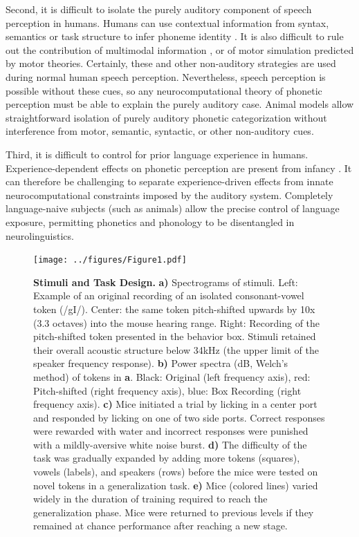\documentclass[11pt]{article}\usepackage[]{graphicx}\usepackage[]{color}
\begin{document}
Second, it is difficult to isolate the purely auditory component of speech perception in humans. Humans can use contextual information from syntax, semantics or task structure to infer phoneme identity \cite{Fox2016,Schouten2003}. It is also difficult to rule out the contribution of multimodal information \cite{Rosenblum2008}, or of motor simulation predicted by motor theories. Certainly, these and other non-auditory strategies are used during normal human speech perception. Nevertheless, speech perception is possible without these cues, so any neurocomputational theory of phonetic perception must be able to explain the purely auditory case. Animal models allow straightforward isolation of purely auditory phonetic categorization without interference from motor, semantic, syntactic, or other non-auditory cues.

Third, it is difficult to control for prior language experience in humans. Experience-dependent effects on phonetic perception are present from infancy \cite{Kuhl1992}. It can therefore be challenging to separate experience-driven effects from innate neurocomputational constraints imposed by the auditory system. Completely language-naive subjects (such as animals) allow the precise control of language exposure, permitting phonetics and phonology to be disentangled in neurolinguistics.

\begin{figure}[!hb]
\begin{centering}
\texttt{[image: ../figures/Figure1.pdf]}
\caption{\label{spectro}{\textbf{Stimuli and Task Design.} \textbf{a)} Spectrograms of stimuli. Left: Example of an original recording of an isolated consonant-vowel token (/gI/). Center: the same token pitch-shifted upwards by 10x (3.3 octaves) into the mouse hearing range. Right: Recording of the pitch-shifted token presented in the behavior box. Stimuli retained their overall acoustic structure below 34kHz (the upper limit of the speaker frequency response). \textbf{b)} Power spectra (dB, Welch's method) of tokens in \textbf{a}. Black: Original (left frequency axis), red: Pitch-shifted (right frequency axis), blue: Box Recording (right frequency axis). \textbf{c)} Mice initiated a trial by licking in a center port and responded by licking on one of two side ports. Correct responses were rewarded with water and incorrect responses were punished with a mildly-aversive white noise burst. \textbf{d)} The difficulty of the task was gradually expanded by adding more tokens (squares), vowels (labels), and speakers (rows) before the mice were tested on novel tokens in a generalization task. \textbf{e)} Mice (colored lines) varied widely in the duration of training required to reach the generalization phase. Mice were returned to previous levels if they remained at chance performance after reaching a new stage.
}}\end{centering}
\end{figure}
\end{document}
